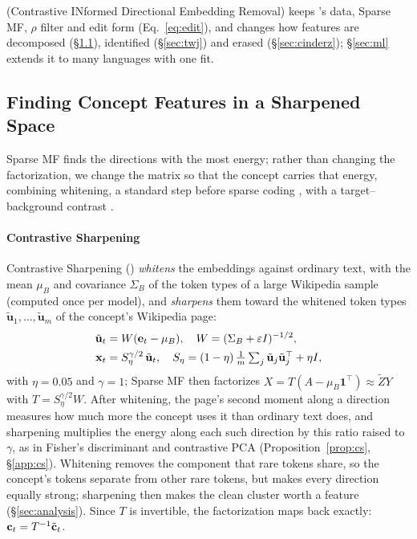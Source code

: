 \section{\cinder{}}
\label{sec:method}

\cinder{} (Contrastive INformed Directional Embedding Removal) keeps \ember{}'s data, Sparse MF, $\rho$ filter and edit form (Eq.~\ref{eq:edit}), and changes how features are decomposed (\S\ref{sec:cs}), identified (\S\ref{sec:twj}) and erased (\S\ref{sec:cinderz}); \S\ref{sec:ml} extends it to many languages with one fit.

\subsection{Finding Concept Features in a Sharpened Space}
\label{sec:cs}

Sparse MF finds the directions with the most energy; rather than changing the factorization, we change the matrix so that the concept carries that energy, combining whitening, a standard step before sparse coding \citep{hyvarinen2000ica}, with a target--background contrast \citep{abid2018exploring}.

\paragraph{Contrastive Sharpening}
Contrastive Sharpening (\cs{}) \emph{whitens} the embeddings against ordinary text, with the mean $\mu_B$ and covariance $\Sigma_B$ of the token types of a large Wikipedia sample (computed once per model), and \emph{sharpens} them toward the whitened token types $\tilde{\mathbf u}_1,\dots,\tilde{\mathbf u}_m$ of the concept's Wikipedia page:
\begin{equation}
\begin{aligned}
  \tilde{\mathbf{u}}_t &= W(\mathbf{e}_t - \mu_B), \quad W = (\Sigma_B + \varepsilon I)^{-1/2},\\
  \mathbf{x}_t &= S_\eta^{\gamma/2}\,\tilde{\mathbf u}_t, \quad
  S_\eta = (1-\eta)\,\tfrac{1}{m}\textstyle\sum_{j} \tilde{\mathbf u}_j \tilde{\mathbf u}_j^{\top} + \eta I ,
\end{aligned}
  \label{eq:whiten}
\end{equation}
with $\eta = 0.05$ and $\gamma = 1$; Sparse MF then factorizes $X = T(A - \mu_B\mathbf 1^{\top}) \approx \tilde Z Y$ with $T = S_\eta^{\gamma/2} W$.
After whitening, the page's second moment along a direction measures how much more the concept uses it than ordinary text does, and sharpening multiplies the energy along each such direction by this ratio raised to $\gamma$, as in Fisher's discriminant and contrastive PCA \citep{fisher1936use,abid2018exploring} (Proposition~\ref{prop:cs}, \S\ref{app:cs}).
Whitening removes the component that rare tokens share, so the concept's tokens separate from other rare tokens, but makes every direction equally strong; sharpening then makes the clean cluster worth a feature (\S\ref{sec:analysis}).
Since $T$ is invertible, the factorization maps back exactly: $\mathbf{c}_t = T^{-1}\tilde{\mathbf{c}}_t$.

